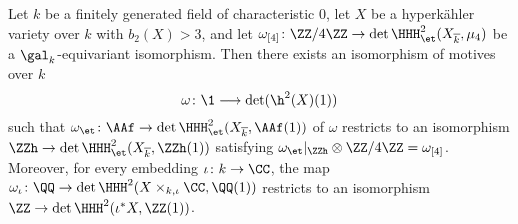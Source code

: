 \begin{lemma}\label{lem:orientation_field}
Let $k$ be a finitely generated field of characteristic $0$, let $X$ be a hyperk\"ahler variety over $k$ with $b_2(X) > 3$, and let $\omega_{[4]}\colon \ZZ/4\ZZ \rightarrow \det \HHH^2_{\et}(X_{\overline{k}},\mu_4)$ be a $\gal_k$-equivariant isomorphism. Then there exists an isomorphism of motives over $k$
$$
\omega\colon \1 \longrightarrow \det (\h^2(X)(1))
$$
    such that $\omega_{\et}\colon \AAf \rightarrow \det \HHH^2_{\et}(X_{\overline{k}},\AAf(1))$ of $\omega$ restricts to an isomorphism $\ZZh \rightarrow \det \HHH^2_{\et}(X_{\overline{k}}, \ZZh(1))$ satisfying $\omega_{\et}|_{\ZZh} \otimes \ZZ/4\ZZ = \omega_{[4]}$. Moreover, for every embedding $\iota\colon k \rightarrow \CC$, the map $\omega_{\iota}\colon \QQ \rightarrow \det \HHH^2(X \times_{k,\iota} \CC,\QQ(1))$ restricts to an isomorphism $\ZZ \rightarrow \det \HHH^2(\iota^* X, \ZZ(1))$.
\end{lemma}
